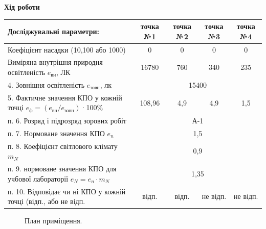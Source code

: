 \documentclass[a4paper,14pt]{extreport}
\begin{document}
\newpage
\begin{landscape}
\begin{center}\textbf{Хід роботи}\end{center}
\begin{table}[h]
\begin{tabular}{|l|c|c|c|c|}
\hline
Досліджувальні параметри:                                    & точка №1 & точка №2 & точка №3 & точка №4 \\ \hline
Коефіцієнт насадки (10,100 або 1000)                         &   0      &   0      &    0     &   0      \\ \hline
Виміряна внутрішня  природня освітленість $e_{\text{вн}}$, ЛК            &   16780  &    760   &  340     &  235     \\ \hline
4. Зовнішня освітленість $e_{\text{зовн}}$, лк                           & \multicolumn{4}{c|}{15400}            \\ \hline
5. Фактичне значення КПО у кожній точці $e_{\text{ф}}=(e_{\text{вн}}/e_{\text{зовн}})$·100\% &    108,96       &   4,9       &    4,9       &     1,5       \\ \hline                   
п. 6. Розряд і підрозряд зорових робіт                       & \multicolumn{4}{c|}{А-1}                     \\ \hline
п. 7. Нормоване значення КПО $e_n$                              & \multicolumn{4}{c|}{1,5}                     \\ \hline
п. 8. Коефіцієнт світлового клімату $m_N$                        & \multicolumn{4}{c|}{0,9}                     \\ \hline
п. 9. нормоване значення КПО для учбової лабораторії $e_N = e_n\cdot m_N$& \multicolumn{4}{c|}{1,35}                     \\ \hline
п. 10. Відповідає чи ні КПО у кожній точці (відп., або не відп.&  відп.    &  відп.     &   не відп.     & не відп.    \\ \hline

\end{tabular}
\end{table}

\begin{figure}[h]
\caption{План приміщення.}
\end{figure}
\end{landscape}
\end{document}
